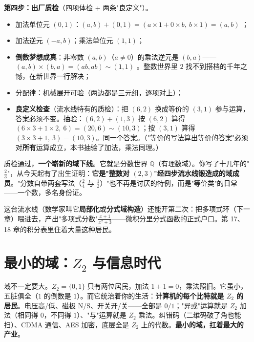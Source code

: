 \textbf{第四步：出厂质检}（四项体检 + 两条"良定义"）。
\begin{itemize}
\item 加法单位元 $(0,1)$：$(a,b) + (0,1) = (a\times1 + 0\times b,\ b\times1) = (a, b)$ \checkmark；
\item 加法逆元 $(-a, b)$；乘法单位元 $(1,1)$；
\item \textbf{倒数梦想成真}：非零数 $(a,b)$（$a\ne0$）的乘法逆元是 $(b,a)$——$(a,b)\times(b,a) = (ab, ab) \sim (1,1)$ \checkmark。整数世界里 $2$ 找不到搭档的千年之憾，在新世界一行解决；
\item 分配律：机械展开可验（两边都是三元组，逐项对上）；
\item \textbf{良定义检查}（流水线特有的质检）：把 $(6,2)$ 换成等价的 $(3,1)$ 参与运算，答案必须不变。抽验：$(6,2)+(1,3)$ 按 $(6,2)$ 算得 $(6\times3+1\times2,\ 6) = (20, 6) \sim (10, 3)$；按 $(3,1)$ 算得 $(3\times3+1,\ 3) = (10,3)$。\checkmark 同一个答案。（"等价的写法算出等价的答案"必须对\textbf{所有}运算成立，本书抽验了加法，乘法同理。）
\end{itemize}
质检通过，\textbf{一个崭新的域下线}。它就是分数世界 $\mathbb{Q}$（有理数域）。你写了十几年的"$\tfrac23$"，从今天起有了出生证明：\textbf{它是"整数对 $(2,3)$"经四步流水线锻造成的域成员}。"分数自带两套写法（$\tfrac24$ 与 $\tfrac12$）"也不再是讨厌的特例，而是"等价类"的日常——一个数，多名身份证。

这台流水线（数学家叫它\textbf{局部化}或\textbf{分式域构造}）还能开第二次：把多项式环（下一章）喂进去，产出"多项式分数"$\tfrac{x+1}{x^2+3}$——微积分里分式函数的正式户口。第 17、18 章的积分表里住着大量这种居民。

\section{最小的域：$Z_2$ 与信息时代}

域不一定要大。$Z_2 = \{0, 1\}$ 只有两位居民，加法 $1+1 = 0$，乘法照旧。它虽小，五脏俱全（$1$ 的倒数是 $1$）。而它统治着你的生活：\textbf{计算机的每个比特就是 $Z_2$ 的居民}。电压高/低、磁极 N/S、开关开/关——全部是 $0/1$；"异或"运算就是 $Z_2$ 加法（相同得 $0$，不同得 $1$）、"与"运算就是 $Z_2$ 乘法。纠错码（二维码破了角也能扫）、CDMA 通信、AES 加密，底层全是 $Z_2$ 上的代数。\textbf{最小的域，扛着最大的产业}。

